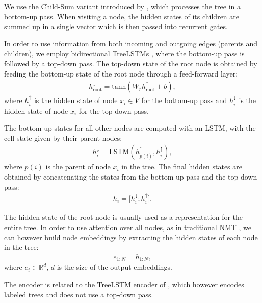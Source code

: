 \documentclass[11pt,a4paper]{article}
\begin{document}
We use the Child-Sum variant introduced by , which processes the tree in a bottom-up pass. When visiting a node, the hidden states of its children are summed up in a single vector which is then passed into recurrent gates.

In order to use information from both incoming and outgoing edges (parents and children), we employ bidirectional TreeLSTMs \cite{eriguchi2016tree}, where the bottom-up pass is followed by a top-down pass. The top-down state of the root node is obtained by feeding the bottom-up state of the root node through a feed-forward layer:
\begin{align*}
h_{\mathrm{root}}^{\downarrow} = \mathrm{tanh} (W_r h_{\mathrm{root}}^{\uparrow} + b),
\end{align*}
where $h_i^{\uparrow}$ is the hidden state of node $x_i \in V$ for the bottom-up pass and $h_i^{\downarrow}$ is the hidden state of node $x_i$ for the top-down pass.

The bottom up states for all other nodes are computed with an LSTM, with the cell state given by their parent nodes:
\begin{align*}
h_{i}^{\downarrow} = \mathrm{LSTM} (h_{p(i)}^{\uparrow}, h_{i}^{\uparrow}),
\end{align*}
where $p(i)$ is the parent of node $x_i$ in the tree.
The final hidden states are obtained by concatenating the states from the bottom-up pass and the top-down pass:
 \begin{align*}
h_{i} = \big[ h_{i}^{\downarrow} ; h_{i}^{\uparrow} \big] .
\end{align*}

The hidden state of the root node is usually used as a representation for the entire tree. In order to use attention over all nodes, as in traditional NMT \cite{bahdanau2014neural}, we can however build node embeddings by extracting the hidden states of each node in the tree:
\begin{align*}
e_{1:N} = h_{1:N}, %
\end{align*}
where $e_i \in \mathbb{R}^{d}$, $d$ is the size of the output embeddings.

The encoder is related to the TreeLSTM encoder of , which however encodes labeled trees and does not use a top-down pass.
\end{document}
